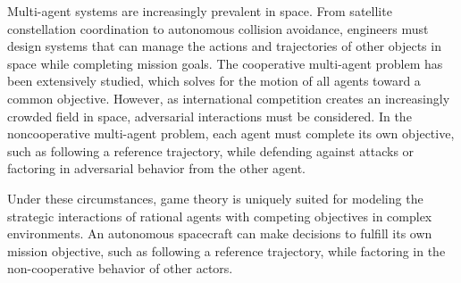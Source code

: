 Multi-agent systems are increasingly prevalent in space. 
% 
From satellite constellation coordination to autonomous collision avoidance, engineers must design systems that can manage the actions and trajectories of other objects in space while completing mission goals. 
% 
The cooperative multi-agent problem has been extensively studied, which solves for the motion of all agents toward a common objective. 
% 
% 
However, as international competition creates an increasingly crowded field in space, adversarial interactions must be considered. 
% 
In the noncooperative multi-agent problem, each agent must complete its own objective, such as following a reference trajectory, while defending against attacks or factoring in adversarial behavior from the other agent.
% 

% 
Under these circumstances, game theory is uniquely suited for modeling the strategic interactions of rational agents with competing objectives in complex environments.
An autonomous spacecraft can make decisions to fulfill its own mission objective, such as following a reference trajectory, while factoring in the non-cooperative behavior of other actors.

